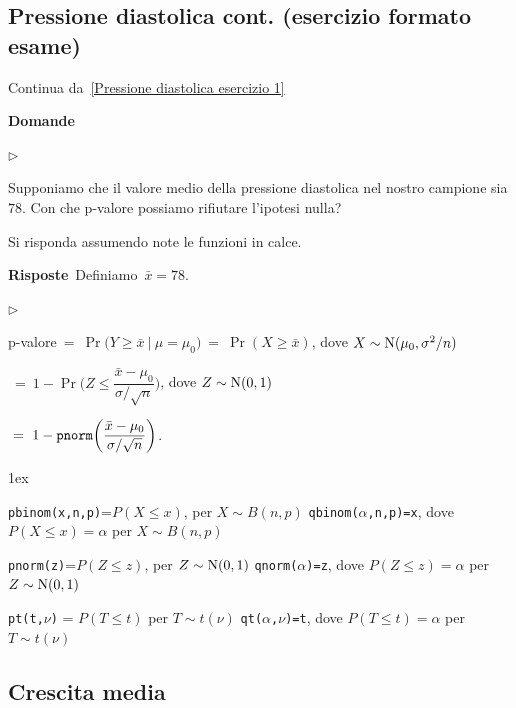 \documentclass[11pt,openany]{book}
\newcommand{\mylabel}[1]{{\footnotesize\textsf{#1}}\hfill}
\renewenvironment{itemize}
  {\begin{list}{$\triangleright$}{%
   \setlength{\parskip}{0mm}
   \setlength{\topsep}{.2\baselineskip}
   \setlength{\rightmargin}{0mm}
   \setlength{\listparindent}{0mm}
   \setlength{\itemindent}{0mm}
   \setlength{\labelwidth}{3ex}
   \setlength{\itemsep}{.4\baselineskip}
   \setlength{\parsep}{0mm}
   \setlength{\partopsep}{0mm}
   \setlength{\labelsep}{1ex}
   \setlength{\leftmargin}{\labelwidth+\labelsep}
   \let\makelabel\mylabel}}{%
   \end{list}\vspace*{-1.3mm}}
\begin{document}
\clearpage\subsection{Pressione diastolica cont. (esercizio formato esame)}
\label{Pressione diastolica esercizio 2}

Continua da~\ref{Pressione diastolica esercizio 1}

\textbf{Domande}

\begin{itemize}
\item[6.] Supponiamo che il valore medio della pressione diastolica nel nostro campione sia $78$. 
Con che p-valore possiamo rifiutare l'ipotesi nulla?
\end{itemize}
Si risponda assumendo note le funzioni in calce.

\textbf{Risposte}\  Definiamo\ $\bar x=78$.\medskip

\begin{itemize}
\item[6.] 

p-valore$\ =\ \Pr\big(Y\ge \bar x\ \mathbin\big|\ \mu=\mu_0\big)\ =\ \Pr(X\ge\bar x)$, dove $X\sim {\rm N}(\mu_0,\sigma^2/n)$\medskip\smallskip

\phantom{p-valore}$\ =\ 1-\Pr\bigg(Z\le \dfrac{\bar x-\mu_0}{\sigma/\sqrt n}\bigg)$, dove $Z\sim {\rm N}(0,1)$\medskip

\phantom{p-valore}$\ =\ 1- {\tt pnorm}\bigg(\dfrac{\bar x-\mu_0}{\sigma/\sqrt n}\bigg)$.

\end{itemize}

\vfill
\parskip1ex
{\hrulefill\scriptsize

{\tt pbinom(x,n,p)}=$P(X\le x)$, per $X\sim B(n,p)$
\hfill 
{\tt qbinom($\alpha$,n,p)=x},  dove $P(X\le x)=\alpha$ per $X\sim B(n,p)$

{\tt pnorm(z)}=$P(Z\le z)$, per $Z\sim {\rm N}(0,1)$
\hfill 
{\tt qnorm($\alpha$)=z},  dove $P(Z\le z)=\alpha$ per $Z\sim {\rm N}(0,1)$

{\tt pt(t,$\nu$)} = $P(T\le t)$ per $T\sim t(\nu)$
\hfill
{\tt qt($\alpha$,$\nu$)=t}, dove $P(T\le t)=\alpha$ per $T\sim t(\nu)$

}

\clearpage\subsection{Crescita media}
\end{document}
